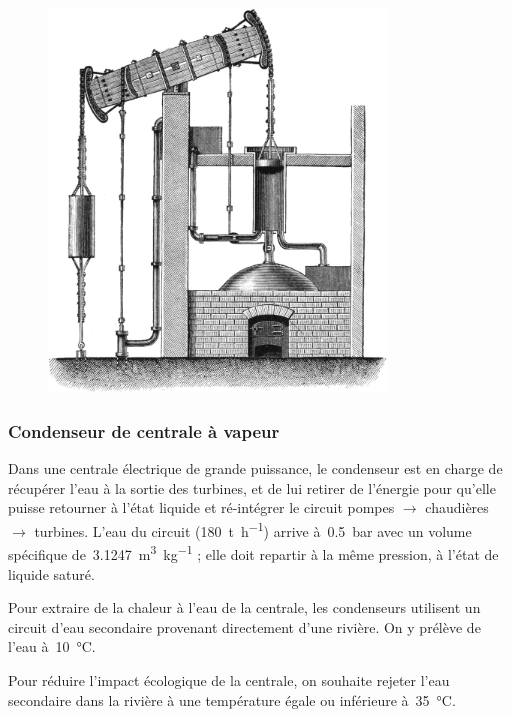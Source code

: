 	\begin{figure}
		\begin{center}
			\includegraphics[width=9cm]{images/moteur_newcomen_2.png}
		\end{center}
		\label{fig_moteur_newcomen}
	\end{figure}



\subsubsection{Condenseur de centrale à vapeur}
\label{exo_condenseur_riviere}

	Dans une centrale électrique de grande puissance, le condenseur est en charge de récupérer l’eau à la sortie des turbines, et de lui retirer de l’énergie pour qu’elle puisse retourner à l’état liquide et ré-intégrer le circuit pompes $\to$ chaudières $\to$ turbines. L’eau du circuit (\SI{180}{\tonne\per\hour}) arrive à~\SI{0,5}{\bar} avec un volume spécifique de~\SI{3,1247}{\metre\cubed\per\kilogram} ; elle doit repartir à la même pression, à l’état de liquide saturé.
	
	Pour extraire de la chaleur à l’eau de la centrale, les condenseurs utilisent un circuit d’eau secondaire provenant directement d’une rivière. On y prélève de l’eau à~\SI{10}{\degreeCelsius}.
	
	Pour réduire l’impact écologique de la centrale, on souhaite rejeter l’eau secondaire dans la rivière à une température égale ou inférieure à~\SI{35}{\degreeCelsius}.
	
